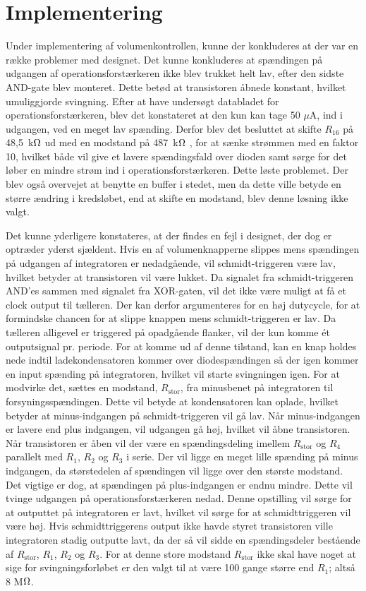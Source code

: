 \section{Implementering}
Under implementering af volumenkontrollen, kunne der konkluderes at der var en række problemer med designet. Det kunne konkluderes at spændingen på udgangen af operationsforstærkeren ikke blev trukket helt lav, efter den sidste AND-gate blev monteret. Dette betød at transistoren åbnede konstant, hvilket umuliggjorde svingning. Efter at have undersøgt databladet for operationsforstærkeren, blev det konstateret at den kun kan tage 50 $\mu$A, ind i udgangen, ved en meget lav spænding. Derfor blev det besluttet at skifte $R_{16}$ på 48,5~k$\ohm$ ud med en modstand på 487~k$\ohm$ , for at sænke strømmen med en faktor 10, hvilket både vil give et lavere spændingsfald over dioden samt sørge for det løber en mindre strøm ind i operationsforstærkeren. Dette løste problemet. Der blev også overvejet at benytte en buffer i stedet, men da dette ville betyde en større ændring i kredsløbet, end at skifte en modstand, blev denne løsning ikke valgt.

Det kunne yderligere konstateres, at der findes en fejl i designet, der dog er optræder yderst sjældent. Hvis en af volumenknapperne slippes mens spændingen på udgangen af integratoren er nedadgående, vil schmidt-triggeren være lav, hvilket betyder at transistoren vil være lukket. Da signalet fra schmidt-triggeren AND'es sammen med signalet fra XOR-gaten, vil det ikke være muligt at få et clock output til tælleren. Der kan derfor argumenteres for en høj dutycycle, for at formindske chancen for at slippe knappen mens schmidt-triggeren er lav. Da tælleren alligevel er triggered på opadgående flanker, vil der kun komme ét outputsignal pr. periode. For at komme ud af denne tilstand, kan en knap holdes nede indtil ladekondensatoren kommer over diodespændingen så der igen kommer en input spænding på integratoren, hvilket vil starte svingningen igen. 
For at modvirke det, sættes en modstand, $R_{\mathrm{stor}}$, fra minusbenet på integratoren til forsyningsspændingen. Dette vil betyde at kondensatoren kan oplade, hvilket betyder at minus-indgangen på schmidt-triggeren vil gå lav. Når minus-indgangen er lavere end plus indgangen, vil udgangen gå høj, hvilket vil åbne transistoren. Når transistoren er åben vil der være en spændingsdeling imellem $R_{\mathrm{stor}}$ og $R_4$ parallelt med $R_1$, $R_2$ og $R_3$ i serie. Der vil ligge en meget lille spænding på minus indgangen, da størstedelen af spændingen vil ligge over den største modstand. Det vigtige er dog, at spændingen på plus-indgangen er endnu mindre. Dette vil tvinge udgangen på operationsforstærkeren nedad. Denne opstilling vil sørge for at outputtet på integratoren er lavt, hvilket vil sørge for at schmidttriggeren vil være høj. Hvis schmidttriggerens output ikke havde styret transistoren ville integratoren stadig outputte lavt, da der så vil sidde en spændingsdeler bestående af $R_{\mathrm{stor}}$, $R_1$, $R_2$ og $R_3$.
For at denne store modstand $R_{\mathrm{stor}}$ ikke skal have noget at sige for svingningsforløbet er den valgt til at være 100 gange større end $R_1$; altså 8 M$\ohm$.

